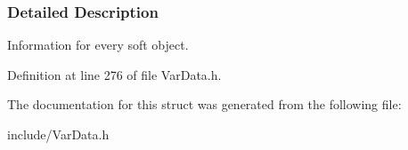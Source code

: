 \subsubsection{Detailed Description}
Information for every soft object. 

Definition at line 276 of file Var\+Data.\+h.



The documentation for this struct was generated from the following file\+:\begin{DoxyCompactItemize}
\item 
include/Var\+Data.\+h\end{DoxyCompactItemize}
